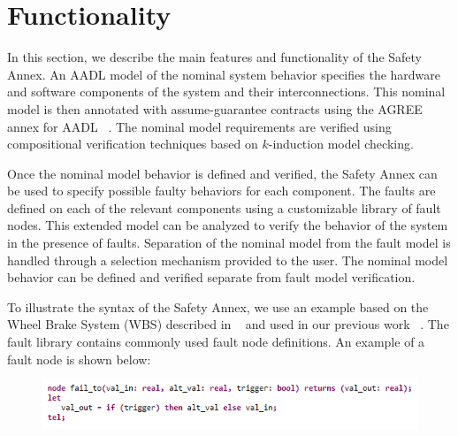 \section{Functionality}
In this section, we describe the main features and functionality of the Safety Annex.
%
An AADL model of the nominal system behavior specifies the hardware and software components of the system and their interconnections. This nominal model is then annotated with assume-guarantee contracts using the AGREE annex for AADL ~\cite{NFM2012:CoGaMiWhLaLu}. The nominal model  requirements are verified using compositional verification techniques based on $k$-induction model checking.

Once the nominal model behavior is defined and verified, the Safety Annex can be used to specify possible faulty behaviors for each component. The faults are defined on each of the relevant components using a customizable library of fault nodes. This extended model can be analyzed to verify the behavior of the system in the presence of faults. Separation of the nominal model from the fault model is handled through a selection mechanism provided to the user. The nominal model behavior can be defined and verified separate from fault model verification.

To illustrate the syntax of the Safety Annex, we use an example based on the Wheel Brake System (WBS) described in ~\cite{AIR6110} and used in our previous work ~\cite{Stewart17:IMBSA}.
The fault library contains commonly used fault node definitions. An example of a fault node is shown below:
\begin{figure}[h!]
\vspace{-0.19in}
\begin{center}
\includegraphics[trim=0 9 0 5,clip,width=1.0\textwidth]{images/faultNode.png}
\end{center}
\vspace{-0.4in}
\end{figure}

